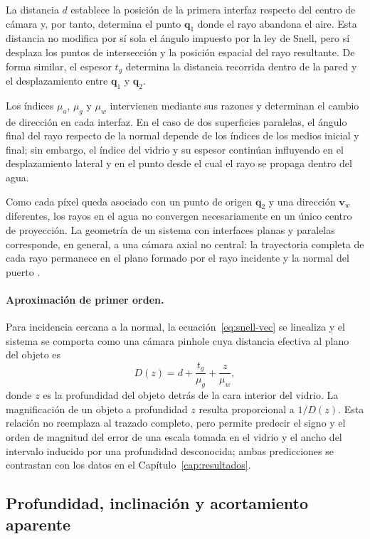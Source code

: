 \documentclass{report}
\begin{document}
La distancia $d$ establece la posición de la primera interfaz respecto del centro de cámara y, por tanto, determina el punto $\mathbf{q}_1$ donde el rayo abandona el aire. Esta distancia no modifica por sí sola el ángulo impuesto por la ley de Snell, pero sí desplaza los puntos de intersección y la posición espacial del rayo resultante. De forma similar, el espesor $t_g$ determina la distancia recorrida dentro de la pared y el desplazamiento entre $\mathbf{q}_1$ y $\mathbf{q}_2$.

Los índices $\mu_a$, $\mu_g$ y $\mu_w$ intervienen mediante sus razones y determinan el cambio de dirección en cada interfaz. En el caso de dos superficies paralelas, el ángulo final del rayo respecto de la normal depende de los índices de los medios inicial y final; sin embargo, el índice del vidrio y su espesor continúan influyendo en el desplazamiento lateral y en el punto desde el cual el rayo se propaga dentro del agua.

Como cada píxel queda asociado con un punto de origen $\mathbf{q}_2$ y una dirección $\mathbf{v}_w$ diferentes, los rayos en el agua no convergen necesariamente en un único centro de proyección. La geometría de un sistema con interfaces planas y paralelas corresponde, en general, a una cámara axial no central: la trayectoria completa de cada rayo permanece en el plano formado por el rayo incidente y la normal del puerto \parencite{Agrawal2012}.

\paragraph{Aproximación de primer orden.} Para incidencia cercana a la normal, la ecuación~\eqref{eq:snell-vec} se linealiza y el sistema se comporta como una cámara pinhole cuya distancia efectiva al plano del objeto es
\begin{equation}
D(z) = d + \frac{t_g}{\mu_g} + \frac{z}{\mu_w},
\label{eq:Dz}
\end{equation}
donde $z$ es la profundidad del objeto detrás de la cara interior del vidrio. La magnificación de un objeto a profundidad $z$ resulta proporcional a $1/D(z)$. Esta relación no reemplaza al trazado completo, pero permite predecir el signo y el orden de magnitud del error de una escala tomada en el vidrio y el ancho del intervalo inducido por una profundidad desconocida; ambas predicciones se contrastan con los datos en el Capítulo~\ref{cap:resultados}.

\subsection{Profundidad, inclinación y acortamiento aparente}
\end{document}
